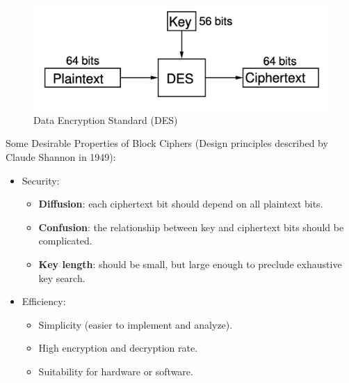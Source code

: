 \documentclass[12pt,titlepage]{article}
\begin{document}
\begin{center}
	\begin{figure}[h!]
		\includegraphics[width=\textwidth]{DES.png}
		\caption{Data Encryption Standard (DES)}
	\end{figure}
\end{center}

Some Desirable Properties of Block Ciphers (Design principles described by Claude Shannon in 1949): \begin{itemize}
\item Security: \begin{itemize}
\item \textbf{Diffusion}: each ciphertext bit should depend on all plaintext bits.
\item \textbf{Confusion}: the relationship between key and ciphertext bits should be complicated.
\item \textbf{Key length}: should be small, but large enough to preclude exhaustive key search.
\end{itemize}
\item Efficiency: \begin{itemize}
\item Simplicity (easier to implement and analyze).
\item High encryption and decryption rate.
\item Suitability for hardware or software.
\end{itemize}
\end{itemize}
\end{document}
